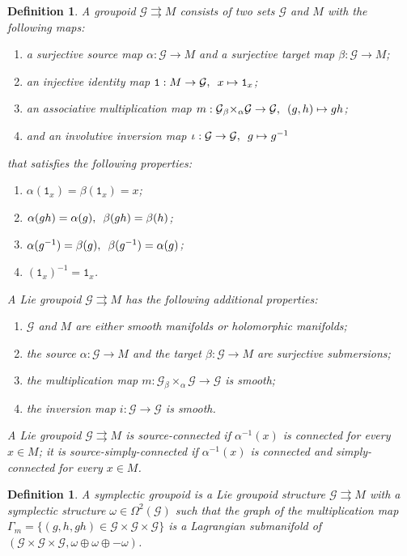 \documentclass{amsart}
\newtheorem{definition}[theorem]{Definition}
\newcommand{\cG}{\mathcal{G}}
\newcommand{\rra}{\rightrightarrows}
\begin{document}
\begin{definition}
A groupoid $\cG \rightrightarrows M$ consists of two sets $\cG$ and $M$ with the following maps:
	\begin{enumerate}
		\item a surjective source map $\alpha: \cG \to M$ and a surjective target map $\beta: \cG \to M$;
		\item an injective identity map $\mathtt{1}: M \to \cG, \enskip x \mapsto \mathtt{1}_x$;
		\item an associative multiplication map $m: \cG {_\beta \times_\alpha} \cG \to \cG, \enskip (g, h) \mapsto gh$;
		\item and an involutive inversion map $\iota: \cG \to \cG, \enskip g \mapsto g^{-1}$
	\end{enumerate}
that satisfies the following properties:
	\begin{enumerate}
		\item $\alpha(\mathtt{1}_x) = \beta(\mathtt{1}_x) = x$;
		\item $\alpha(gh) = \alpha(g), \enskip \beta(gh) = \beta(h)$;
		\item $\alpha(g^{-1}) = \beta(g), \enskip \beta(g^{-1}) = \alpha(g)$;
		\item $(\mathtt{1}_x)^{-1} = \mathtt{1}_x$.
	\end{enumerate}
A Lie groupoid $\cG \rightrightarrows M$ has the following additional properties:
	\begin{enumerate}
		\item $\cG$ and $M$ are either smooth manifolds or holomorphic manifolds;
		\item the source $\alpha: \cG \to M$ and the target $\beta: \cG \to M$ are surjective submersions;
		\item the multiplication map $m: \cG {_\beta \times_\alpha} \cG \to \cG$ is smooth;
		\item the inversion map $i: \cG \to \cG$ is smooth.
	\end{enumerate}
A Lie groupoid $\cG \rightrightarrows M$ is source-connected if $\alpha^{-1}(x)$ is connected for every $x \in M$; it is source-simply-connected if $\alpha^{-1}(x)$ is connected and simply-connected for every $x \in M$.
\end{definition}

\begin{definition}
A symplectic groupoid is a Lie groupoid structure $\cG \rra M$ with a symplectic structure $\omega \in \Omega^2(\cG)$ such that the graph of the multiplication map $\Gamma_m = \{(g, h, gh) \in \cG \times \cG \times \cG\}$ is a Lagrangian submanifold of $(\cG \times \cG \times \cG, \omega \oplus \omega \oplus -\omega)$.
\end{definition}
\end{document}
